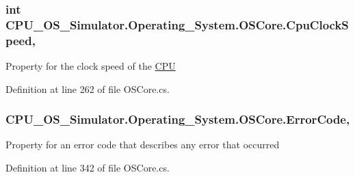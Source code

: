 \subsubsection[{Cpu\+Clock\+Speed}]{\setlength{\rightskip}{0pt plus 5cm}int C\+P\+U\+\_\+\+O\+S\+\_\+\+Simulator.\+Operating\+\_\+\+System.\+O\+S\+Core.\+Cpu\+Clock\+Speed\hspace{0.3cm}{\ttfamily [get]}, {\ttfamily [set]}}\label{class_c_p_u___o_s___simulator_1_1_operating___system_1_1_o_s_core_a1ea93a6cc37dbae4bc607d09fd6e75db}


Property for the clock speed of the \hyperlink{namespace_c_p_u___o_s___simulator_1_1_c_p_u}{C\+P\+U} 



Definition at line 262 of file O\+S\+Core.\+cs.

\hypertarget{class_c_p_u___o_s___simulator_1_1_operating___system_1_1_o_s_core_a77a647e293c14574919b144cb2e8998f}{}
\subsubsection[{Error\+Code}]{ C\+P\+U\+\_\+\+O\+S\+\_\+\+Simulator.\+Operating\+\_\+\+System.\+O\+S\+Core.\+Error\+Code\hspace{0.3cm}{\ttfamily [get]}, {\ttfamily [set]}}\label{class_c_p_u___o_s___simulator_1_1_operating___system_1_1_o_s_core_a77a647e293c14574919b144cb2e8998f}


Property for an error code that describes any error that occurred 



Definition at line 342 of file O\+S\+Core.\+cs.

\hypertarget{class_c_p_u___o_s___simulator_1_1_operating___system_1_1_o_s_core_ac620c813df8b2c9ea386cff20d3fee84}{}
